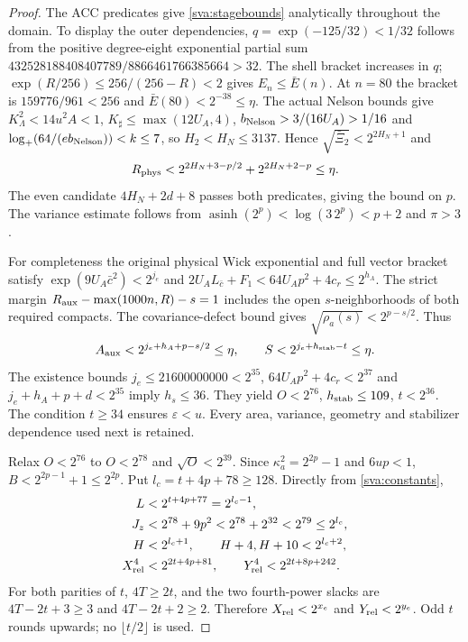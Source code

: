 \documentclass[11pt]{article}
\theoremstyle{plain}
\theoremstyle{definition}
\theoremstyle{remark}
\begin{document}
\begin{proof}
The ACC predicates give \eqref{sva:stagebounds} analytically throughout
the domain. To display the outer dependencies, $q=\exp(-125/32)<1/32$
follows from the positive degree-eight exponential partial sum
$432528188408407789/8866461766385664>32$. The shell bracket increases
in $q$; $\exp(R/256)\le256/(256-R)<2$ gives $E_n\le\bar E(n)$.
At $n=80$ the bracket is $159776/961<256$ and
$\bar E(80)<2^{-38}\le\eta$. The actual Nelson bounds give
$K_\Lambda^2<14u^2A<1$, $K_\sharp\le\max(12U_A,4)$,
$b_{\rm Nelson}>3/(16U_A)>1/16$ and
$\log_+(64/(e b_{\rm Nelson}))<k\le7$, so $H_2<H_N\le3137$.
Hence $\sqrt{\bar\Xi_2}<2^{2H_N+1}$ and
\begin{equation}\label{sva:regulator}
 R_{\rm phys}<2^{2H_N+3-p/2}+2^{2H_N+2-p}\le\eta.
\end{equation}
The even candidate $4H_N+2d+8$ passes both predicates, giving the bound
on $p$. The variance estimate follows from
$\operatorname{asinh}(2^p)<\log(3\,2^p)<p+2$ and $\pi>3$.

For completeness the original physical Wick exponential and full
vector bracket satisfy $\exp(9U_A\bar c^2)<2^{j_e}$ and
$2U_A L_{\bar c}+F_1<64U_Ap^2+4c_r\le2^{h_A}$.
The strict margin $R_{\rm aux}-\max(1000n,R)-s=1$ includes the
open $s$-neighborhoods of both required compacts. The covariance-defect
bound gives $\sqrt{\rho_a(s)}<2^{p-s/2}$. Thus
\begin{equation}\label{sva:remaining-errors}
 A_{\rm aux}<2^{j_e+h_A+p-s/2}\le\eta,\qquad
 S<2^{j_e+h_{\rm stab}-t}\le\eta.
\end{equation}
The existence bounds $j_e\le21600000000<2^{35}$,
$64U_Ap^2+4c_r<2^{37}$ and $j_e+h_A+p+d<2^{35}$ imply $h_s\le36$.
They yield $O<2^{76}$, $h_{\rm stab}\le109$, $t<2^{36}$.
The condition $t\ge34$ ensures $\varepsilon<u$. Every area,
variance, geometry and stabilizer dependence used next is retained.

Relax $O<2^{76}$ to $O<2^{78}$ and $\sqrt O<2^{39}$. Since
$\kappa_a^2=2^{2p}-1$ and $6up<1$, $B<2^{2p-1}+1\le2^{2p}$.
Put $l_c=t+4p+78\ge128$. Directly from \eqref{sva:constants},
\begin{align}\label{sva:H-enclosure}
 L&<2^{t+4p+77}=2^{l_c-1},\nonumber\\
 J_z&<2^{78}+9p^2<2^{78}+2^{32}<2^{79}\le2^{l_c},\nonumber\\
 H&<2^{l_c+1},\qquad H+4,H+10<2^{l_c+2},\nonumber\\
 X_{\rm rel}^4&<2^{2t+4p+81},\qquad
 Y_{\rm rel}^4<2^{2t+8p+242}.
\end{align}
For both parities of $t$, $4T\ge2t$, and the two fourth-power slacks are
$4T-2t+3\ge3$ and $4T-2t+2\ge2$. Therefore
$X_{\rm rel}<2^{x_e}$ and $Y_{\rm rel}<2^{y_e}$. Odd $t$ rounds
upwards; no $\lfloor t/2\rfloor$ is used.


\end{proof}
\end{document}
